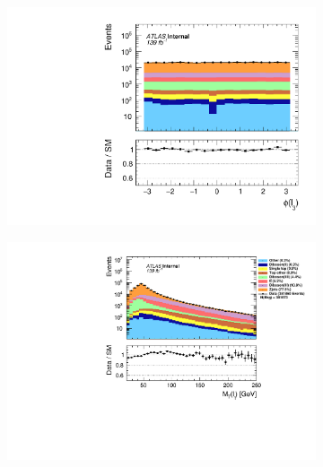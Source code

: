 \begin{figure}[H]
{\begin{subfigure}{.405\textwidth}
        \includegraphics[width=\textwidth]{Figures/FeaturesHistograms/MCvsData/lep3_Phi.pdf}
        \caption{}
        \label{fig:lep3_Phi}
    \end{subfigure}
    \hfill
    \begin{subfigure}{.525\textwidth}
        \includegraphics[width=\textwidth]{Figures/FeaturesHistograms/MCvsData/lep1_Mt.pdf}
        \caption{}
        \label{fig:lep1_Mt}
    \end{subfigure}
    }
\end{figure}
